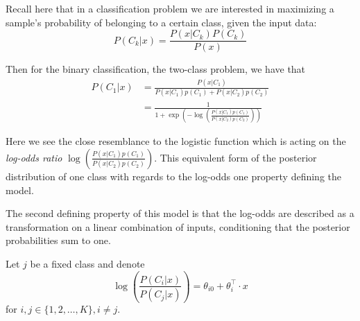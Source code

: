 




Recall here that in a classification problem we are interested in maximizing a sample's probability of belonging to a certain class, given the input data:
\begin{equation}
P(C_k| x) = \frac{P(x|C_k)P(C_k)}{P(x)}
\end{equation}

Then for the binary classification, the two-class problem, we have that
\begin{equation}
\begin{split}
P(C_1| x) & = \frac{P(x|C_1) }{P(x|C_1)p(C_1) + P(x|C_2)p(C_2)} \\
& = \frac{1 }
{1 + \exp \left(- \log \left(  \frac{ P(x|C_1)p(C_1)}
{P(x|C_2)p(C_2)
} \right) \right)
}
\end{split}
\end{equation}

Here we see the close resemblance to the logistic function which is acting on the \textit{log-odds ratio} $ \log \left(  \frac{ P(x|C_1)p(C_1)}{P(x|C_2)p(C_2) } \right)$.
This equivalent form of the posterior distribution of one class with regards to the log-odds one property defining the model.



The second defining property of this model is that the log-odds are described as a transformation on a linear combination of inputs, conditioning that the posterior probabilities sum to one.

Let $j$ be a fixed class and denote
\begin{equation}
 \log \left( \frac{P(C_i|x)}{P(C_j|x)} \right) = \theta_{i0} + \theta_i^\intercal \cdot x
 \label{logit-logOddss}
 \end{equation}
for $i,j \in \{1,2,\ldots,K\}, i\neq j$.

